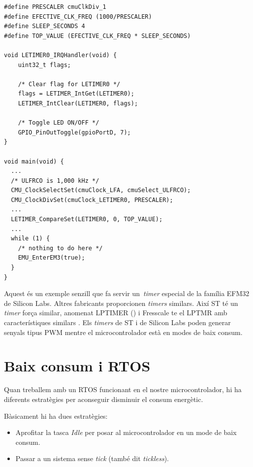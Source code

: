 \begin{lstlisting}[style=customc, caption={Exemple ús de {\bf LETIMER}}, label=LETIMER_example]
#define PRESCALER cmuClkDiv_1
#define EFECTIVE_CLK_FREQ (1000/PRESCALER)
#define SLEEP_SECONDS 4
#define TOP_VALUE (EFECTIVE_CLK_FREQ * SLEEP_SECONDS)

void LETIMER0_IRQHandler(void) {
	uint32_t flags;

	/* Clear flag for LETIMER0 */
	flags = LETIMER_IntGet(LETIMER0);
	LETIMER_IntClear(LETIMER0, flags);

	/* Toggle LED ON/OFF */
	GPIO_PinOutToggle(gpioPortD, 7);
}

void main(void) {
  ...
  /* ULFRCO is 1,000 kHz */
  CMU_ClockSelectSet(cmuClock_LFA, cmuSelect_ULFRCO);
  CMU_ClockDivSet(cmuClock_LETIMER0, PRESCALER);
  ...
  LETIMER_CompareSet(LETIMER0, 0, TOP_VALUE);
  ...
  while (1) {
    /* nothing to do here */
    EMU_EnterEM3(true);
  }
}
\end{lstlisting}

Aquest és un exemple senzill que fa servir un {\em timer} especial de la família EFM32 de Silicon Labs. Altres fabricants proporcionen {\em timers} similars. Així ST té un {\em timer} força similar, anomenat LPTIMER (\cite{ST_ANS4865}) i Fresscale te el LPTMR amb característiques similars \cite{Kinetis_LPTMR}. Els {\em timers} de ST i de Silicon Labs  poden generar senyals tipus \gls{PWM} mentre el microcontrolador està en modes de baix consum.

\section{Baix consum i RTOS}
\label{sec:lowpwerRTOS}
Quan treballem amb un RTOS funcionant en el nostre microcontrolador, hi ha diferents estratègies per aconseguir disminuir el consum energètic.

Bàsicament hi ha dues estratègies:
\begin{itemize}
 \item Aprofitar la tasca {\em Idle} per posar al microcontrolador en un mode de baix consum.
 \item Passar a un sistema sense {\em tick} (també dit {\em tickless}).
\end{itemize}

